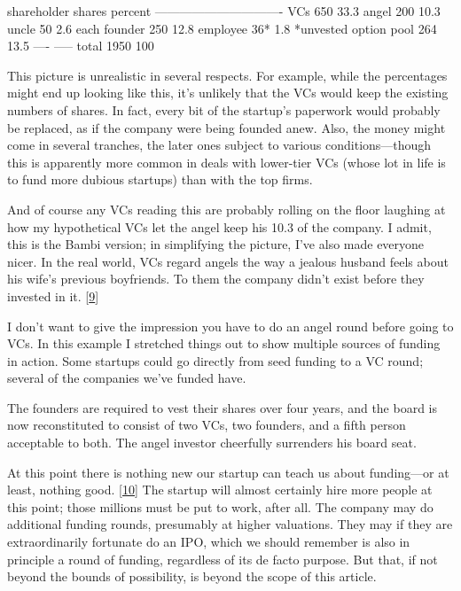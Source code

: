 shareholder   shares    percent
-------------------------------
VCs             650       33.3
angel           200       10.3
uncle            50        2.6
each founder    250       12.8
employee         36*       1.8     *unvested
option pool     264       13.5
               ----      -----
total          1950      100

This picture is unrealistic in several respects.  For example, while
the percentages might end up looking like this, it's unlikely that
the VCs would keep the existing numbers of shares.  In fact, every
bit of the startup's paperwork would probably be replaced, as if
the company were being founded anew.  Also, the money might come
in several tranches, the later ones subject to various 
conditions---though this is apparently more common in deals with lower-tier VCs
(whose lot in life is to fund more dubious startups) than with the
top firms.

And of course any VCs reading this are probably rolling on the floor
laughing at how my hypothetical VCs let the angel keep his 10.3 of
the company.  I admit, this is the Bambi version; in simplifying
the picture, I've also made everyone nicer.  In the real world, VCs
regard angels the way a jealous husband feels about his wife's
previous boyfriends.  To them the company didn't exist before they
invested in it.  
[\href{\#f9n}{9}]

I don't want to give the impression you have to do an angel round
before going to VCs.  In this example I stretched things out to
show multiple sources of funding in action. Some startups could go
directly from seed funding to a VC round; several of the companies
we've funded have.

The founders are required to vest their shares over four years, and
the board is now reconstituted to consist of two VCs, two founders,
and a fifth person acceptable to both. The angel investor cheerfully
surrenders his board seat.

At this point there is nothing new our startup can teach us about
funding---or at least, nothing good.   
[\href{\#f10n}{10}]
The startup will almost
certainly hire more people at this point; those millions must be
put to work, after all.  The company may do additional funding
rounds, presumably at higher valuations.  They may if they are
extraordinarily fortunate do an IPO, which we should remember is
also in principle a round of funding, regardless of its de facto
purpose.  But that, if not beyond the bounds of possibility, is
beyond the scope of this article.

